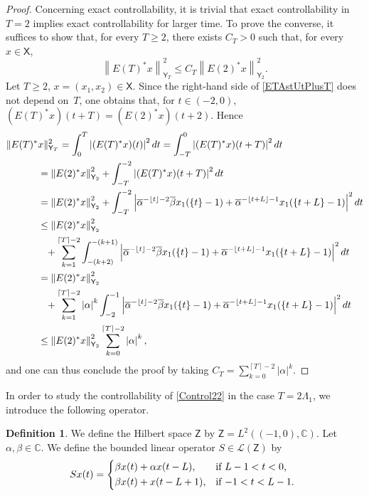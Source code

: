 \documentclass[JEP,XML,SOM,Unicode]{cedram}
\theoremstyle{plain}
\theoremstyle{definition}
\newtheorem{defi}[theo]{Definition}
\newcommand{\norm}[1]{\left\lVert #1\right\lVert}
\newcommand{\abs}[1]{\left\lvert #1\right \rvert}
\newcommand{\floor}[1]{\left\lfloor #1 \right\rfloor}
\newcommand{\ceil}[1]{\left\lceil #1 \right\rceil}
\begin{document}
\begin{proof}
Concerning exact controllability, it is trivial that exact controllability in $T = 2$ implies exact controllability for larger time. To prove the converse, it suffices to show that, for every $T \geq 2$, there exists $C_T > 0$ such that, for every $x \in \mathsf X$,
\[
\norm{E(T)^\ast x}_{\mathsf Y_T}^2 \leq C_T \norm{E(2)^\ast x}_{\mathsf Y_2}^2.
\]
Let $T \geq 2$, $x = (x_1, x_2) \in \mathsf X$. Since the right-hand side of \eqref{ETAstUtPlusT} does not depend on~$T$, one obtains that, for $t \in (-2, 0)$, $(E(T)^\ast x)(t + T) = (E(2)^\ast x)(t + 2)$. Hence
\begin{align*}
\Vert E(T)^\ast& x\Vert_{\mathsf Y_T}^2  = \int_0^T \abs{(E(T)^\ast x)(t)}^2 dt = \int_{-T}^0 \abs{(E(T)^\ast x)(t + T)}^2 dt  \\
& = \norm{E(2)^\ast x}_{\mathsf Y_2}^2 + \int_{-T}^{-2} \abs{(E(T)^\ast x)(t + T)}^2 dt  \\
& = \norm{E(2)^\ast x}_{\mathsf Y_2}^2 + \int_{-T}^{-2} \abs{\overline\alpha^{-\floor{t} - 2} \overline\beta x_1(\{t\} - 1) + \overline\alpha^{-\floor{t + L} - 1} x_1(\{t + L\} - 1)}^2 dt  \\
& \leq \norm{E(2)^\ast x}_{\mathsf Y_2}^2 \\
& \hphantom{\leq} {} + \sum_{k=1}^{\ceil{T} - 2} \int_{-(k+2)}^{-(k+1)} \abs{\overline\alpha^{-\floor{t} - 2} \overline\beta x_1(\{t\} - 1) + \overline\alpha^{-\floor{t + L} - 1} x_1(\{t + L\} - 1)}^2 dt  \\
& = \norm{E(2)^\ast x}_{\mathsf Y_2}^2 \\
& \hphantom{=} {} + \sum_{k=1}^{\ceil{T} - 2} \abs{\alpha}^k \int_{-2}^{-1} \abs{\overline\alpha^{-\floor{t} - 2} \overline\beta x_1(\{t\} - 1) + \overline\alpha^{-\floor{t + L} - 1} x_1(\{t + L\} - 1)}^2 dt  \\
& \leq \norm{E(2)^\ast x}_{\mathsf Y_2}^2 \sum_{k=0}^{\ceil{T} - 2} \abs{\alpha}^k,
\end{align*}
and one can thus conclude the proof by taking $C_T = \sum_{k=0}^{\ceil{T} - 2} \abs{\alpha}^k$.
\end{proof}

In order to study the controllability of \eqref{Control22} in the case $T = 2 \Lambda_1$, we introduce the following operator.

\begin{defi}
\label{DefinitionS}
We define the Hilbert space $\mathsf Z$ by $\mathsf Z = L^2((-1, 0), \mathbb C)$. Let $\alpha, \beta \in \mathbb C$. We define the bounded linear operator $S \in \mathcal L(\mathsf Z)$ by
\begin{equation}
\label{DefS}
S x(t) =
\begin{dcases*}
\beta x(t) + \alpha x(t - L), & if $L - 1 < t < 0$, \\
\beta x(t) + x(t - L + 1), & if $-1 < t < L - 1$.
\end{dcases*}
\end{equation}
\end{defi}
\end{document}
